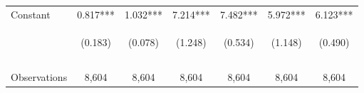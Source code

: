 \begin{center}
\begin{tabular}{lcccccc}
Constant & 0.817*** & 1.032*** & 7.214*** & 7.482*** & 5.972*** & 6.123*** \\
 & \begin{footnotesize}(0.183)\end{footnotesize} & \begin{footnotesize}(0.078)\end{footnotesize} & \begin{footnotesize}(1.248)\end{footnotesize} & \begin{footnotesize}(0.534)\end{footnotesize} & \begin{footnotesize}(1.148)\end{footnotesize} & \begin{footnotesize}(0.490)\end{footnotesize} \\
 & \begin{footnotesize}[0.000]\end{footnotesize} & \begin{footnotesize}[0.000]\end{footnotesize} & \begin{footnotesize}[0.000]\end{footnotesize} & \begin{footnotesize}[0.000]\end{footnotesize} & \begin{footnotesize}[0.000]\end{footnotesize} & \begin{footnotesize}[0.000]\end{footnotesize} \\
\vspace{4pt} & \begin{footnotesize}\end{footnotesize} & \begin{footnotesize}\end{footnotesize} & \begin{footnotesize}\end{footnotesize} & \begin{footnotesize}\end{footnotesize} & \begin{footnotesize}\end{footnotesize} & \begin{footnotesize}\end{footnotesize} \\
Observations & 8,604 & 8,604 & 8,604 & 8,604 & 8,604 & 8,604 \\

\end{tabular}
\end{center}
